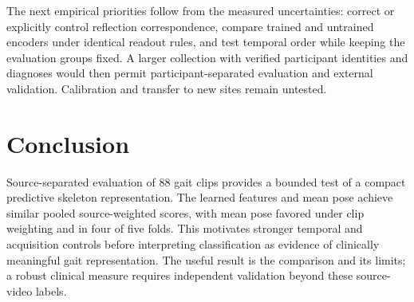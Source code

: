 \documentclass[10pt,twocolumn,letterpaper]{article}
\begin{document}
The next empirical priorities follow from the measured uncertainties: correct or explicitly control reflection correspondence, compare trained and untrained encoders under identical readout rules, and test temporal order while keeping the evaluation groups fixed. A larger collection with verified participant identities and diagnoses would then permit participant-separated evaluation and external validation. Calibration and transfer to new sites remain untested.

\section{Conclusion}
Source-separated evaluation of 88 gait clips provides a bounded test of a compact predictive skeleton representation. The learned features and mean pose achieve similar pooled source-weighted scores, with mean pose favored under clip weighting and in four of five folds. This motivates stronger temporal and acquisition controls before interpreting classification as evidence of clinically meaningful gait representation. The useful result is the comparison and its limits; a robust clinical measure requires independent validation beyond these source-video labels.

{\small


}
\end{document}
